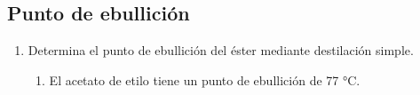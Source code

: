 \subsection{Punto de ebullición}
\begin{enumerate}
    \item Determina el punto de ebullición del éster mediante destilación simple.
    \begin{enumerate}
        \item El acetato de etilo tiene un punto de ebullición de 77 °C.
    \end{enumerate}
\end{enumerate}